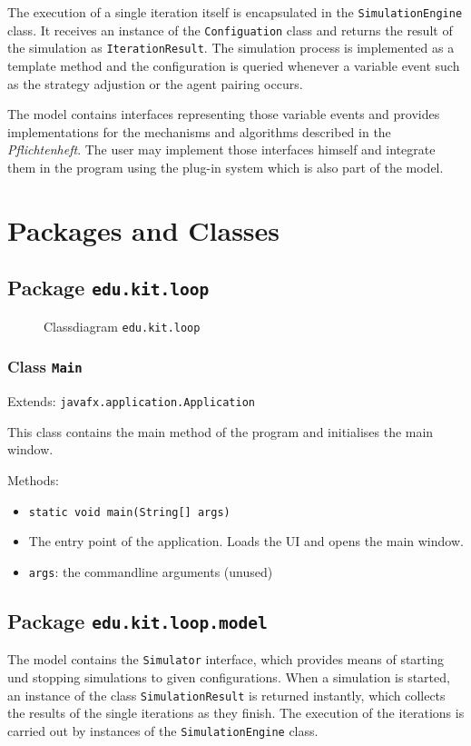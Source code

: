 \documentclass[parskip=full,11pt]{scrartcl}
\begin{document}
The execution of a single iteration itself is encapsulated in the \texttt{SimulationEngine} class. It receives an instance of the \texttt{Configuation} class and returns the result of the simulation as \texttt{IterationResult}. The simulation process is implemented as a template method and the configuration is queried whenever a variable event such as the strategy adjustion or the agent pairing occurs.

The model contains interfaces representing those variable events and provides implementations for the mechanisms and algorithms described in the \textit{Pflichtenheft}. The user may implement those interfaces himself and integrate them in the program using the plug-in system which is also part of the model.

\section{Packages and Classes}

\subsection{Package \texttt{edu.kit.loop}}
\iftrue
\begin{figure}[h]
	\centering
	\fontsize{11}{8}\selectfont
	

	\caption{Classdiagram \texttt{edu.kit.loop}}
\end{figure}
\fi
\subsubsection{Class \texttt{Main}}
Extends: \texttt{javafx.application.Application}

This class contains the main method of the program and initialises the main window.

Methods:
\begin{itemize}\itemsep -10pt
\item \texttt{static void main(String[] args)}
\item[] The entry point of the application. Loads the UI and opens the main window.
\item[] \texttt{args}: the commandline arguments (unused)
\end{itemize}
\newpage
\subsection{Package \texttt{edu.kit.loop.model}}
The model contains the \texttt{Simulator} interface, which provides means of starting und stopping simulations to given configurations. When a simulation is started, an instance of the class \texttt{SimulationResult} is returned instantly, which collects the results of the single iterations as they finish. The execution of the iterations is carried out by instances of the \texttt{SimulationEngine} class.
\end{document}

